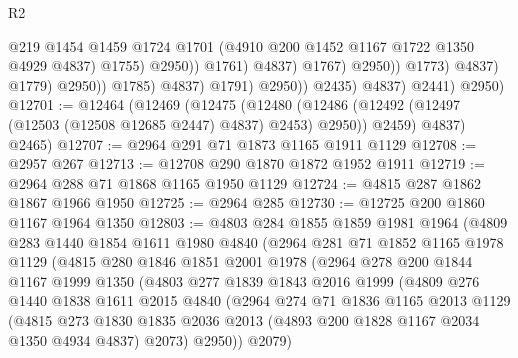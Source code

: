 \begin{lexlean}{R2}
\begin{coremodule}
                                                @219
                                                @1454
                                                @1459
                                                @1724
                                                @1701
                                                (@4910 @200 @1452 @1167 @1722 @1350 @4929 @4837)
                                                @1755)
                                              @2950))
                                          @1761)
                                        @4837)
                                      @1767)
                                    @2950))
                                @1773)
                              @4837)
                            @1779)
                          @2950))
                      @1785)
                    @4837)
                  @1791)
                @2950))
            @2435)
          @4837)
        @2441)
      @2950)
@12701 := @12464
    (@12469
      (@12475
        (@12480 (@12486 (@12492 (@12497 (@12503 (@12508 @12685 @2447) @4837) @2453) @2950)) @2459)
        @4837)
      @2465)
@12707 := @2964 @291 @71 @1873 @1165 @1911 @1129
@12708 := @2957 @267
@12713 := @12708 @290 @1870 @1872 @1952 @1911
@12719 := @2964 @288 @71 @1868 @1165 @1950 @1129
@12724 := @4815 @287 @1862 @1867 @1966 @1950
@12725 := @2964 @285
@12730 := @12725 @200 @1860 @1167 @1964 @1350
@12803 := @4803
    @284
    @1855
    @1859
    @1981
    @1964
    (@4809
      @283
      @1440
      @1854
      @1611
      @1980
      @4840
      (@2964
        @281
        @71
        @1852
        @1165
        @1978
        @1129
        (@4815
          @280
          @1846
          @1851
          @2001
          @1978
          (@2964
            @278
            @200
            @1844
            @1167
            @1999
            @1350
            (@4803
              @277
              @1839
              @1843
              @2016
              @1999
              (@4809
                @276
                @1440
                @1838
                @1611
                @2015
                @4840
                (@2964
                  @274
                  @71
                  @1836
                  @1165
                  @2013
                  @1129
                  (@4815
                    @273
                    @1830
                    @1835
                    @2036
                    @2013
                    (@4893 @200 @1828 @1167 @2034 @1350 @4934 @4837)
                    @2073)
                  @2950))
              @2079)

\end{coremodule}
\end{lexlean}
